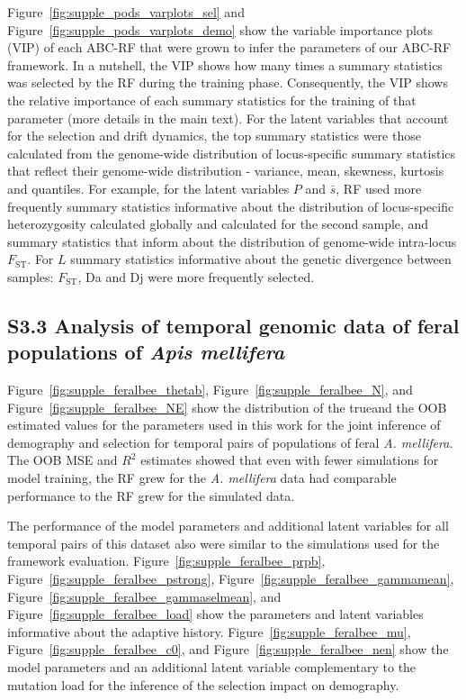 \documentclass[a4paper, 12pt]{article}
\begin{document}
Figure~\ref{fig:supple_pods_varplots_sel} and Figure~\ref{fig:supple_pods_varplots_demo} show the variable importance plots (VIP) of each ABC-RF that were grown to infer the parameters of our ABC-RF framework. In a nutshell, the VIP shows how many times a summary statistics was selected by the RF during the training phase. Consequently, the VIP shows the relative importance of each summary statistics for the training of that parameter (more details in the main text). For the latent variables that account for the selection and drift dynamics, the top summary statistics were those calculated from the genome-wide distribution of locus-specific summary statistics that reflect their genome-wide distribution - variance, mean, skewness, kurtosis and quantiles. For example, for the latent variables $P$ and $\bar{s}$, RF used more frequently summary statistics informative about the distribution of locus-specific heterozygosity calculated globally and calculated for the second sample, and summary statistics that inform about the distribution of genome-wide intra-locus $F_{\mathrm{ST}}$. For $L$ summary statistics informative about the genetic divergence between samples: $F_{\mathrm{ST}}$, Da and Dj were more frequently selected. 

\subsection*{S3.3 Analysis of temporal genomic data of feral populations of \textit{Apis mellifera}}

Figure~\ref{fig:supple_feralbee_thetab}, Figure~\ref{fig:supple_feralbee_N}, and Figure~\ref{fig:supple_feralbee_NE} show the distribution of the trueand the OOB estimated values for the parameters used in this work for the joint inference of demography and selection for temporal pairs of populations of feral \textit{A. mellifera}. The OOB MSE and $R^2$ estimates showed that even with fewer simulations for model training, the RF grew for the  \textit{A. mellifera} data had comparable performance to the RF grew for the simulated data.

The performance of the model parameters and additional latent variables for all temporal pairs of this dataset also were similar to the simulations used for the framework evaluation. Figure~\ref{fig:supple_feralbee_prpb}, Figure~\ref{fig:supple_feralbee_pstrong}, Figure~\ref{fig:supple_feralbee_gammamean}, Figure~\ref{fig:supple_feralbee_gammaselmean}, and Figure~\ref{fig:supple_feralbee_load} show the parameters and latent variables informative about the adaptive history. Figure~\ref{fig:supple_feralbee_mu}, Figure~\ref{fig:supple_feralbee_c0}, and Figure~\ref{fig:supple_feralbee_nen} show the model parameters and an additional latent variable complementary to the mutation load for the inference of the selection impact on demography.
\end{document}
